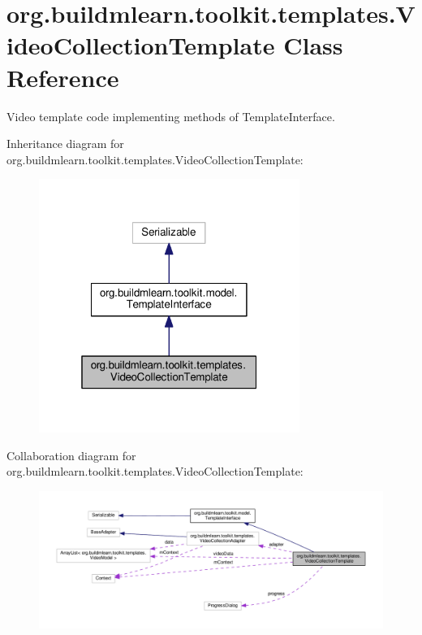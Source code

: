\hypertarget{classorg_1_1buildmlearn_1_1toolkit_1_1templates_1_1VideoCollectionTemplate}{}\section{org.\+buildmlearn.\+toolkit.\+templates.\+Video\+Collection\+Template Class Reference}
\label{classorg_1_1buildmlearn_1_1toolkit_1_1templates_1_1VideoCollectionTemplate}


Video template code implementing methods of Template\+Interface.  




Inheritance diagram for org.\+buildmlearn.\+toolkit.\+templates.\+Video\+Collection\+Template\+:
\nopagebreak
\begin{figure}[H]
\begin{center}
\leavevmode
\includegraphics[width=241pt]{classorg_1_1buildmlearn_1_1toolkit_1_1templates_1_1VideoCollectionTemplate__inherit__graph}
\end{center}
\end{figure}


Collaboration diagram for org.\+buildmlearn.\+toolkit.\+templates.\+Video\+Collection\+Template\+:
\nopagebreak
\begin{figure}[H]
\begin{center}
\leavevmode
\includegraphics[width=350pt]{classorg_1_1buildmlearn_1_1toolkit_1_1templates_1_1VideoCollectionTemplate__coll__graph}
\end{center}
\end{figure}
